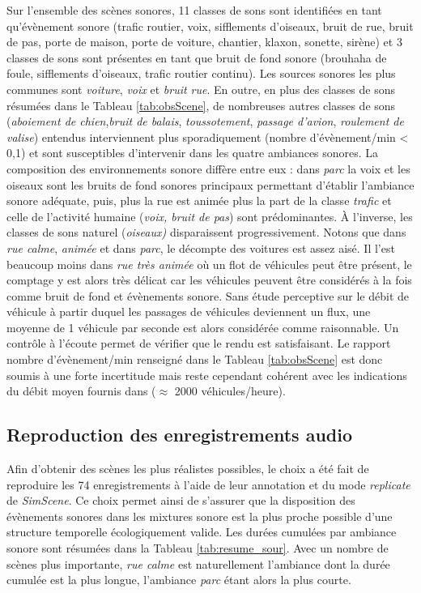 Sur l'ensemble des scènes sonores, 11 classes de sons sont identifiées en tant qu'évènement sonore (trafic routier, voix, sifflements d'oiseaux, bruit de rue, bruit de pas, porte de maison, porte de voiture, chantier, klaxon, sonette, sirène) et 3 classes de sons sont présentes en tant que bruit de fond sonore (brouhaha de foule, sifflements d'oiseaux, trafic routier continu).
Les sources sonores les plus communes sont \textit{voiture}, \textit{voix} et \textit{bruit rue}. En outre, en plus des classes de sons résumées dans le Tableau \ref{tab:obsScene}, de nombreuses autres classes de sons (\textit{aboiement de chien},\textit{bruit de balais}, \textit{toussotement}, \textit{passage d'avion}, \textit{roulement de valise}) entendus interviennent plus sporadiquement (nombre d'évènement/min < 0,1) et sont susceptibles d'intervenir dans les quatre ambiances sonores.
La composition des environnements sonore diffère entre eux : dans \textit{parc} la voix et les oiseaux sont les bruits de fond sonores principaux permettant d'établir l'ambiance sonore adéquate, puis, plus la rue est animée plus la part de la classe \textit{trafic} et celle de l'activité humaine (\textit{voix, bruit de pas}) sont prédominantes. À l'inverse, les classes de sons \og naturel \fg{} (\textit{oiseaux)} disparaissent progressivement.
Notons que dans \textit{rue calme}, \textit{animée} et dans \textit{parc}, le décompte des voitures est assez aisé. Il l'est beaucoup moins dans \textit{rue très animée} où un flot de véhicules peut être présent, le comptage y est alors très délicat car les véhicules peuvent être considérés à la fois comme bruit de fond et évènements sonore.
Sans étude perceptive sur le débit de véhicule à partir duquel les passages de véhicules deviennent un flux, une moyenne de 1 véhicule par seconde est alors considérée comme raisonnable. Un contrôle à l'écoute permet de vérifier que le rendu est satisfaisant. Le rapport nombre d'évènement/min renseigné dans le Tableau \ref{tab:obsScene} est donc soumis à une forte incertitude mais reste cependant cohérent avec les indications du débit moyen fournis dans \cite{aumond2017modeling} ($\approx$ 2000 véhicules/heure). \\

\subsection{Reproduction des enregistrements audio}

Afin d'obtenir des scènes les plus réalistes possibles, le choix a été fait de reproduire les 74 enregistrements à l'aide de leur annotation et du mode \textit{replicate} de \textit{SimScene}. Ce choix permet ainsi de s'assurer que la disposition des évènements sonores dans les mixtures sonore est la plus proche possible d'une structure temporelle écologiquement valide. Les durées cumulées par ambiance sonore sont résumées dans la Tableau \ref{tab:resume_sour}. Avec un nombre de scènes plus importante, \textit{rue calme} est naturellement l'ambiance dont la durée cumulée est la plus longue, l'ambiance \textit{parc} étant alors la plus courte.

